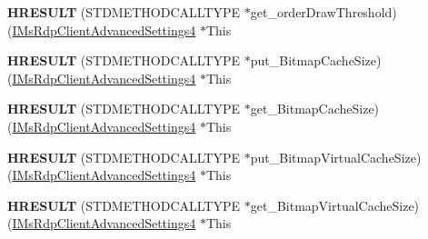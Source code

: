 \begin{DoxyCompactItemize}
\item 
\mbox{\label{struct_m_s_t_s_c_lib_1_1_i_ms_rdp_client_advanced_settings4_vtbl_a996602287755cc17c32b4f6eba0c6438}} 
{\bfseries H\+R\+E\+S\+U\+LT} (S\+T\+D\+M\+E\+T\+H\+O\+D\+C\+A\+L\+L\+T\+Y\+PE $\ast$get\+\_\+order\+Draw\+Threshold)(\hyperlink{interface_m_s_t_s_c_lib_1_1_i_ms_rdp_client_advanced_settings4}{I\+Ms\+Rdp\+Client\+Advanced\+Settings4} $\ast$This
\item 
\mbox{\label{struct_m_s_t_s_c_lib_1_1_i_ms_rdp_client_advanced_settings4_vtbl_aa7879bd32778730279ce8a9196b2f77a}} 
{\bfseries H\+R\+E\+S\+U\+LT} (S\+T\+D\+M\+E\+T\+H\+O\+D\+C\+A\+L\+L\+T\+Y\+PE $\ast$put\+\_\+\+Bitmap\+Cache\+Size)(\hyperlink{interface_m_s_t_s_c_lib_1_1_i_ms_rdp_client_advanced_settings4}{I\+Ms\+Rdp\+Client\+Advanced\+Settings4} $\ast$This
\item 
\mbox{\label{struct_m_s_t_s_c_lib_1_1_i_ms_rdp_client_advanced_settings4_vtbl_a90e7360a3043cd0a8001ae14919001e9}} 
{\bfseries H\+R\+E\+S\+U\+LT} (S\+T\+D\+M\+E\+T\+H\+O\+D\+C\+A\+L\+L\+T\+Y\+PE $\ast$get\+\_\+\+Bitmap\+Cache\+Size)(\hyperlink{interface_m_s_t_s_c_lib_1_1_i_ms_rdp_client_advanced_settings4}{I\+Ms\+Rdp\+Client\+Advanced\+Settings4} $\ast$This
\item 
\mbox{\label{struct_m_s_t_s_c_lib_1_1_i_ms_rdp_client_advanced_settings4_vtbl_a67f9a977f731820f81855db3e6d22aab}} 
{\bfseries H\+R\+E\+S\+U\+LT} (S\+T\+D\+M\+E\+T\+H\+O\+D\+C\+A\+L\+L\+T\+Y\+PE $\ast$put\+\_\+\+Bitmap\+Virtual\+Cache\+Size)(\hyperlink{interface_m_s_t_s_c_lib_1_1_i_ms_rdp_client_advanced_settings4}{I\+Ms\+Rdp\+Client\+Advanced\+Settings4} $\ast$This
\item 
\mbox{\label{struct_m_s_t_s_c_lib_1_1_i_ms_rdp_client_advanced_settings4_vtbl_a6dd18f473ca56640edbaf23c0e8be6ba}} 
{\bfseries H\+R\+E\+S\+U\+LT} (S\+T\+D\+M\+E\+T\+H\+O\+D\+C\+A\+L\+L\+T\+Y\+PE $\ast$get\+\_\+\+Bitmap\+Virtual\+Cache\+Size)(\hyperlink{interface_m_s_t_s_c_lib_1_1_i_ms_rdp_client_advanced_settings4}{I\+Ms\+Rdp\+Client\+Advanced\+Settings4} $\ast$This

\end{DoxyCompactItemize}
